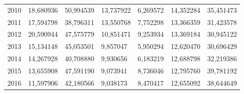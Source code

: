 \begin{table}
\begin{tabular}{p{1cm}p{2cm}p{2cm}p{2cm}p{2cm}p{2cm}p{2cm}}
 2010 &                18,680936 &                 50,994539 &    13,737922 &                                    6,269572 &                                   14,352284 &         35,451473 \\
 2011 &                17,594798 &                 38,796311 &    13,550768 &                                    7,752298 &                                   13,366359 &         31,423578 \\
 2012 &                20,590944 &                 47,575779 &    10,851471 &                                    9,253934 &                                   13,369184 &         30,945122 \\
 2013 &                15,134148 &                 45,053501 &     9,857047 &                                    5,950294 &                                   12,620470 &         30,696429 \\
 2014 &                14,267928 &                 40,708880 &     9,930656 &                                    6,183219 &                                   12,688798 &         32,219386 \\
 2015 &                13,655908 &                 47,591190 &     9,073941 &                                    8,736046 &                                   12,795760 &         39,781192 \\
 2016 &                11,597906 &                 42,180566 &     9,038173 &                                    8,470417 &                                   12,655092 &         38,644649 \\
\bottomrule
\end{tabular}
\end{table}
